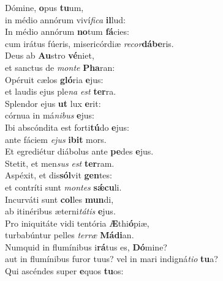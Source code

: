 \evenverse Dómine, \textbf{o}pus \textbf{tu}um,~\*\\
\evenverse in médio annórum viví\textit{fi}\textit{ca} \textbf{il}lud:\\
\oddverse In médio annórum \textbf{no}tum \textbf{fá}cies:~\*\\
\oddverse cum irátus fúeris, misericórdiæ \textit{re}\textit{cor}\textbf{dá}\textbf{be}ris.\\
\evenverse Deus ab \textbf{Au}stro \textbf{vé}niet,~\*\\
\evenverse et sanctus de \textit{mon}\textit{te} \textbf{Pha}ran:\\
\oddverse Opéruit cælos \textbf{gló}ria \textbf{e}jus:~\*\\
\oddverse et laudis ejus ple\textit{na} \textit{est} \textbf{ter}ra.\\
\evenverse Splendor ejus \textbf{ut} lux \textbf{e}rit:~\*\\
\evenverse córnua in má\textit{ni}\textit{bus} \textbf{e}jus:\\
\oddverse Ibi abscóndita est forti\textbf{tú}do \textbf{e}jus:~\*\\
\oddverse ante fáciem \textit{e}\textit{jus} \textbf{i}\textbf{bit} mors.\\
\evenverse Et egrediétur diábolus ante \textbf{pe}des \textbf{e}jus.~\*\\
\evenverse Stetit, et men\textit{sus} \textit{est} \textbf{ter}ram.\\
\oddverse Aspéxit, et dis\textbf{sól}vit \textbf{gen}tes:~\*\\
\oddverse et contríti sunt \textit{mon}\textit{tes} \textbf{sǽ}\textbf{cu}li.\\
\evenverse Incurváti sunt \textbf{col}les \textbf{mun}di,~\*\\
\evenverse ab itinéribus æterni\textit{tá}\textit{tis} \textbf{e}jus.\\
\oddverse Pro iniquitáte vidi tentória \textbf{Æ}thi\textbf{ó}piæ,~\*\\
\oddverse turbabúntur pelles \textit{ter}\textit{ræ} \textbf{Má}\textbf{di}an.\\
\evenverse Numquid in flumínibus i\textbf{rá}tus es, \textbf{Dó}mine?~\*\\
\evenverse aut in flumínibus furor tuus? vel in mari indigná\textit{ti}\textit{o} \textbf{tu}a?\\
\oddverse Qui ascéndes super \textbf{e}quos \textbf{tu}os:~\*\\
